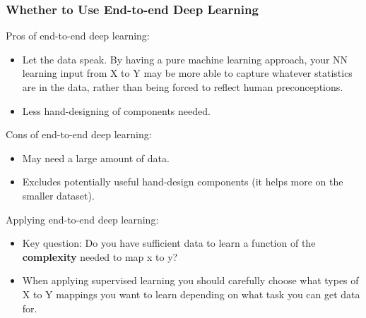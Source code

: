 \subsubsection{Whether to Use End-to-end Deep Learning}
Pros of end-to-end deep learning:
\begin{itemize}
    \item Let the data speak. By having a pure machine learning approach, your NN learning input from X to Y may be more able to capture whatever statistics are in the data, rather than being forced to reflect human preconceptions.
    \item Less hand-designing of components needed.
\end{itemize}

Cons of end-to-end deep learning:
\begin{itemize}
    \item May need a large amount of data.
    \item Excludes potentially useful hand-design components (it helps more on the smaller dataset).
\end{itemize}

Applying end-to-end deep learning:
\begin{itemize}
    \item Key question: Do you have sufficient data to learn a function of the \textbf{complexity} needed to map x to y?
    \item When applying supervised learning you should carefully choose what types of X to Y mappings you want to learn depending on what task you can get data for.
\end{itemize}
\newpage